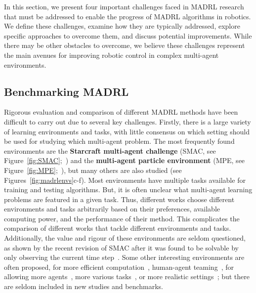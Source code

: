 In this section, we present four important challenges faced in MADRL research that must be addressed to enable the progress of MADRL algorithms in robotics. We define these challenges, examine how they are typically addressed, explore specific approaches to overcome them, and discuss potential improvements. While there may be other obstacles to overcome, we believe these challenges represent the main avenues for improving robotic control in complex multi-agent environments. 



\subsection{Benchmarking MADRL}\label{sec:MADRL:Benchmark}

Rigorous evaluation and comparison of different MADRL methods have been difficult to carry out due to several key challenges. Firstly, there is a large variety of learning environments and tasks, with little consensus on which setting should be used for studying which multi-agent problem. The most frequently found environments are the \textbf{Starcraft multi-agent challenge} (SMAC, see Figure~\ref{fig:SMAC};~\cite{Samvelyan2019_SMAC}) and the \textbf{multi-agent particle environment} (MPE, see Figure~\ref{fig:MPE};~\cite{Lowe2017_MADDPG}), but many others are also studied (see Figures~\ref{fig:madrlenvs}c-f). Most environments have multiple tasks available for training and testing algorithms. But, it is often unclear what multi-agent learning problems are featured in a given task. Thus, different works choose different environments and tasks arbitrarily based on their preferences, available computing power, and the performance of their method. 
This complicates the comparison of different works that tackle different environments and tasks. Additionally, the value and rigour of these environments are seldom questioned, as shown by the recent revision of SMAC after it was found to be solvable by only observing the current time step~\citep{Ellis2023_SMACv2}. 
Some other interesting environments are often proposed, for more efficient computation~\citep{Lechner2023_GigaStep, Michalski2023_SMACLite}, human-agent teaming~\citep{Carroll2019_Overcooked}, for allowing more agents~\citep{Lechner2023_GigaStep}, more various tasks~\citep{Leroy2023_IMPMARL}, or more realistic settings~\citep{Kurach2020_GoogleFoot, Vinitsky2022_Nocturne}; but there are seldom included in new studies and benchmarks. 

